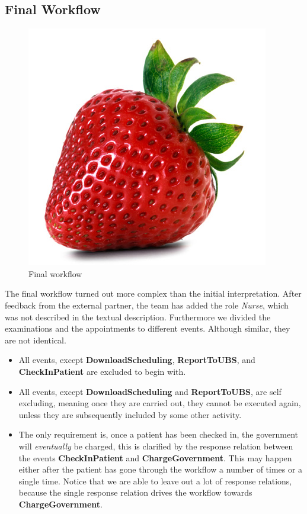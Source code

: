 \subsection{Final Workflow}

\begin{figure}
\centering
\includegraphics[width=0.5\linewidth]{Figures/strawberry}
\caption{\label{fig:FinalWorkflow} Final workflow}
\end{figure}

The final workflow turned out more complex than the initial interpretation. After feedback from the external partner, the team has added the role \textit{Nurse}, which was not described in the textual description. Furthermore we divided the examinations and the appointments to different events. Although similar, they are not identical. 
\begin{itemize}
\item All events, except \textbf{DownloadScheduling}, \textbf{ReportToUBS}, and \textbf{CheckInPatient} are excluded to begin with.
\item All events, except \textbf{DownloadScheduling} and \textbf{ReportToUBS}, are self excluding, meaning once they are carried out, they cannot be executed again, unless they are subsequently included by some other activity. 
\item The only requirement is, once a patient has been checked in, the government will \textit{eventually} be charged, this is clarified by the response relation between the events \textbf{CheckInPatient} and \textbf{ChargeGovernment}. This may happen either after the patient has gone through the workflow a number of times or a single time. Notice that we are able to leave out a lot of response relations, because the single response relation drives the workflow towards \textbf{ChargeGovernment}.
\end{itemize}

